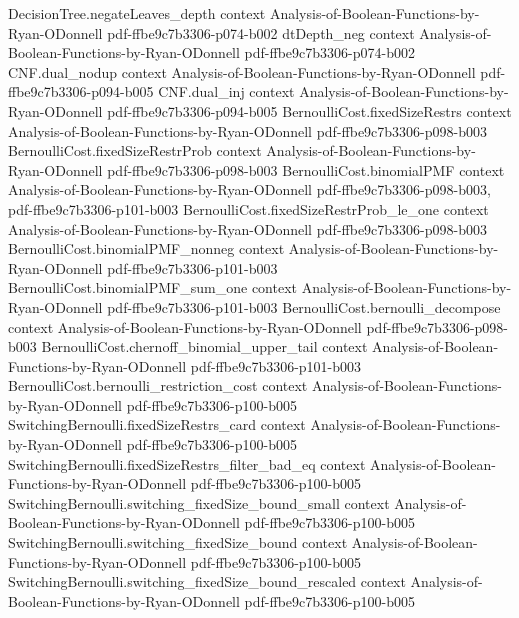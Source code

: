 \begin{lemma}
\proofstep
  {DecisionTree.negateLeaves_depth}
  {context}
  {Analysis-of-Boolean-Functions-by-Ryan-ODonnell}
  {pdf-ffbe9c7b3306-p074-b002}
\proofstep
  {dtDepth_neg}
  {context}
  {Analysis-of-Boolean-Functions-by-Ryan-ODonnell}
  {pdf-ffbe9c7b3306-p074-b002}
\proofstep
  {CNF.dual_nodup}
  {context}
  {Analysis-of-Boolean-Functions-by-Ryan-ODonnell}
  {pdf-ffbe9c7b3306-p094-b005}
\proofstep
  {CNF.dual_inj}
  {context}
  {Analysis-of-Boolean-Functions-by-Ryan-ODonnell}
  {pdf-ffbe9c7b3306-p094-b005}
\proofstep
  {BernoulliCost.fixedSizeRestrs}
  {context}
  {Analysis-of-Boolean-Functions-by-Ryan-ODonnell}
  {pdf-ffbe9c7b3306-p098-b003}
\proofstep
  {BernoulliCost.fixedSizeRestrProb}
  {context}
  {Analysis-of-Boolean-Functions-by-Ryan-ODonnell}
  {pdf-ffbe9c7b3306-p098-b003}
\proofstep
  {BernoulliCost.binomialPMF}
  {context}
  {Analysis-of-Boolean-Functions-by-Ryan-ODonnell}
  {pdf-ffbe9c7b3306-p098-b003,
    pdf-ffbe9c7b3306-p101-b003}
\proofstep
  {BernoulliCost.fixedSizeRestrProb_le_one}
  {context}
  {Analysis-of-Boolean-Functions-by-Ryan-ODonnell}
  {pdf-ffbe9c7b3306-p098-b003}
\proofstep
  {BernoulliCost.binomialPMF_nonneg}
  {context}
  {Analysis-of-Boolean-Functions-by-Ryan-ODonnell}
  {pdf-ffbe9c7b3306-p101-b003}
\proofstep
  {BernoulliCost.binomialPMF_sum_one}
  {context}
  {Analysis-of-Boolean-Functions-by-Ryan-ODonnell}
  {pdf-ffbe9c7b3306-p101-b003}
\proofstep
  {BernoulliCost.bernoulli_decompose}
  {context}
  {Analysis-of-Boolean-Functions-by-Ryan-ODonnell}
  {pdf-ffbe9c7b3306-p098-b003}
\proofstep
  {BernoulliCost.chernoff_binomial_upper_tail}
  {context}
  {Analysis-of-Boolean-Functions-by-Ryan-ODonnell}
  {pdf-ffbe9c7b3306-p101-b003}
\proofstep
  {BernoulliCost.bernoulli_restriction_cost}
  {context}
  {Analysis-of-Boolean-Functions-by-Ryan-ODonnell}
  {pdf-ffbe9c7b3306-p100-b005}
\proofstep
  {SwitchingBernoulli.fixedSizeRestrs_card}
  {context}
  {Analysis-of-Boolean-Functions-by-Ryan-ODonnell}
  {pdf-ffbe9c7b3306-p100-b005}
\proofstep
  {SwitchingBernoulli.fixedSizeRestrs_filter_bad_eq}
  {context}
  {Analysis-of-Boolean-Functions-by-Ryan-ODonnell}
  {pdf-ffbe9c7b3306-p100-b005}
\proofstep
  {SwitchingBernoulli.switching_fixedSize_bound_small}
  {context}
  {Analysis-of-Boolean-Functions-by-Ryan-ODonnell}
  {pdf-ffbe9c7b3306-p100-b005}
\proofstep
  {SwitchingBernoulli.switching_fixedSize_bound}
  {context}
  {Analysis-of-Boolean-Functions-by-Ryan-ODonnell}
  {pdf-ffbe9c7b3306-p100-b005}
\proofstep
  {SwitchingBernoulli.switching_fixedSize_bound_rescaled}
  {context}
  {Analysis-of-Boolean-Functions-by-Ryan-ODonnell}
  {pdf-ffbe9c7b3306-p100-b005}

\end{lemma}
